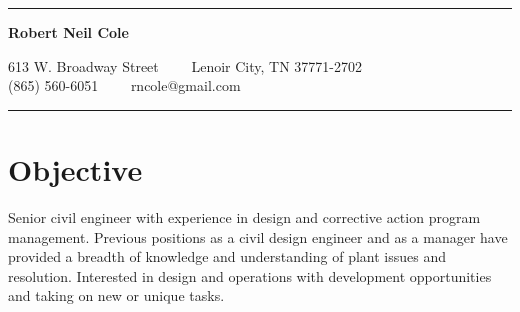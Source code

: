 \documentclass[11pt,letterpaper]{article}
\begin{document}
\chead{}
\rhead{\thepage}
\lfoot{}
\cfoot{}
\rfoot{}
\thispagestyle{empty}

\hrule
\begin{center}
{\LARGE \textbf{Robert Neil Cole}}

613 W. Broadway Street\ \ \textbullet
\ \ Lenoir City, TN 37771-2702
\\
\hspace{.35em}(865) 560-6051\ \ \textbullet
\ \ rncole@gmail.com
\end{center}
\hrule
\vspace{-0.4em}

\section*{Objective}
Senior civil engineer with experience in design and corrective action program management. Previous positions as a civil design engineer and as a manager have provided a breadth of knowledge and understanding of plant issues and resolution. Interested in design and operations with development opportunities and taking on new or unique tasks.\\
\end{document}
